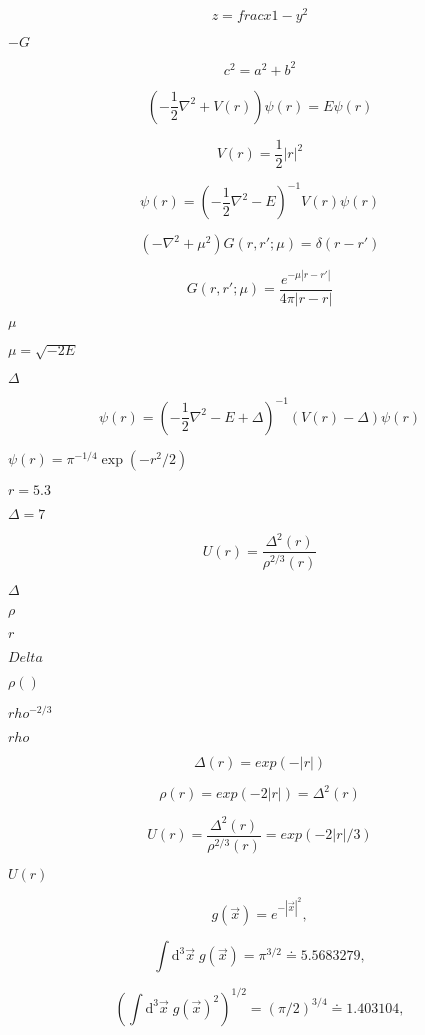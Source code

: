 \documentclass{article}
\begin{document}
\[
z = frac{x}{1 - y^2}
\]
\pagebreak

$-G$
\pagebreak

\[
c^2 = a^2 + b^2
\]
\pagebreak

\[
\left( -\frac{1}{2} \nabla^2 + V(r) \right) \psi(r) = E \psi(r)
\]
\pagebreak

\[
V(r) = \frac{1}{2} |r|^2
\]
\pagebreak

\[
\psi(r) = \left( -\frac{1}{2} \nabla^2 - E \right)^{-1} V(r) \psi(r)
\]
\pagebreak

\[
\left(-\nabla^2 + \mu^2 \right) G(r,r'; \mu) = \delta(r-r')
\]
\pagebreak

\[
G(r,r'; \mu) = \frac{e^{-\mu |r-r'|}}{4 \pi |r-r|}
\]
\pagebreak

$\mu$
\pagebreak

$\mu = \sqrt{-2 E}$
\pagebreak

$\Delta$
\pagebreak

\[
\psi(r) = \left( -\frac{1}{2} \nabla^2 - E + \Delta \right)^{-1} \left( V(r) -\Delta\right)  \psi(r)
\]
\pagebreak

$\psi(r)=\pi^{-1/4}\exp(-r^2 / 2)$
\pagebreak

$r=5.3$
\pagebreak

$\Delta=7$
\pagebreak

\[
U(r) = \frac{\Delta^2 (r)}{\rho^{2/3} (r)}
\]
\pagebreak

$ \Delta $
\pagebreak

$ \rho $
\pagebreak

$ r $
\pagebreak

$ Delta $
\pagebreak

$ \rho() $
\pagebreak

$ rho^{-2/3} $
\pagebreak

$ rho $
\pagebreak

\[
\Delta(r) = exp(- | r | )
\]
\pagebreak

\[
\rho(r) = exp(- 2 | r | ) = \Delta^2(r)
\]
\pagebreak

\[
U(r) = \frac{\Delta^2 (r)}{\rho^{2/3} (r)} = exp( - 2 | r | / 3)
\]
\pagebreak

$
U(r) $
\pagebreak

\[ g(\vec{x}) = e^{-|\vec{x}|^2}, \]
\pagebreak

\[
   \int \mathrm{d}^3 \vec{x} \; g(\vec{x}) = \pi^{3/2} \doteq 5.5683279,
\]
\pagebreak

\[
   \left( \int \mathrm{d}^3 \vec{x} \; g(\vec{x})^2 \right)^{1/2} = (\pi/2)^{3/4} \doteq 1.403104,
\]
\pagebreak
\end{document}
